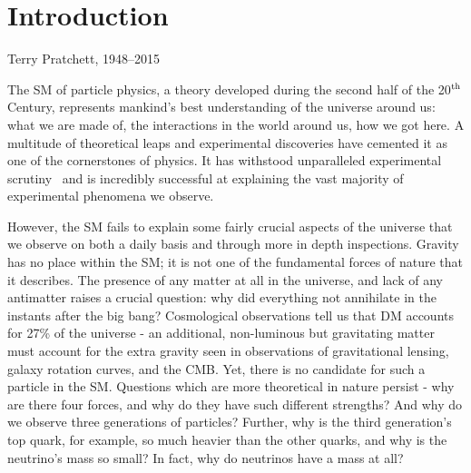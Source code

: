 \chapter{Introduction}
\label{chap:intro}



{Terry Pratchett, 1948--2015}

The \ac{SM} of particle physics, a theory developed during the second half of the 20$^{\rm th}$ Century, represents mankind's best understanding of the universe around us: what we are made of, the interactions in the world around us, how we got here. 
A multitude of theoretical leaps and experimental discoveries have cemented it as one of the cornerstones of physics. 
It has withstood unparalleled experimental scrutiny~\cite{PDG} and is incredibly successful at explaining the vast majority of experimental phenomena we observe.

However, the \ac{SM} fails to explain some fairly crucial aspects of the universe that we observe on both a daily basis and through more in depth inspections. 
Gravity has no place within the \ac{SM}; it is not one of the fundamental forces of nature that it describes. 
The presence of any matter at all in the universe, and lack of any antimatter raises a crucial question: why did everything not annihilate in the instants after the big bang?
Cosmological observations tell us that \ac{DM} accounts for 27\% of the  universe - an additional, non-luminous but gravitating matter must account for the extra gravity seen in observations of gravitational lensing, galaxy rotation curves, and the \ac{CMB}.
Yet, there is no candidate for such a particle in the \ac{SM}. 
Questions which are more theoretical in nature persist - why are there four forces, and why do they have such different strengths? 
And why do we observe three generations of particles? Further, why is the third generation's top quark, for example, so much heavier than the other quarks, and why is the neutrino's mass so small? In fact, why do neutrinos have a mass at all?

